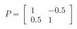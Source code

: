 \documentclass[preview]{standalone}
\begin{document}
\begin{align*}
P = \begin{bmatrix} 1 & -0.5 \\ 0.5 & 1 \end{bmatrix}
\end{align*}
\end{document}
